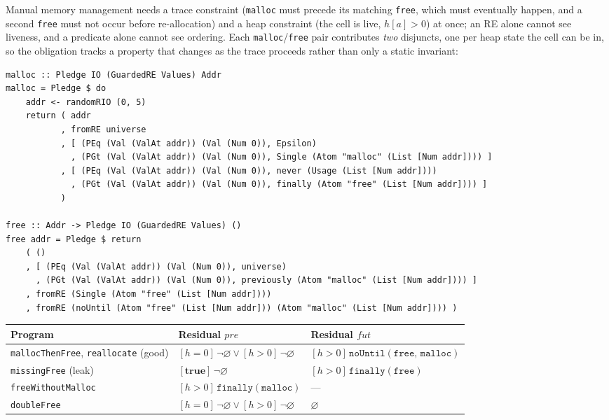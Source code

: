 \documentclass[acmsmall,screen]{acmart}
\newcommand{\pre}{\mathit{pre}}
\newcommand{\fut}{\mathit{fut}}
\newcommand{\finally}[1]{\mathtt{finally}(#1)}
\newcommand{\noUntil}[2]{\mathtt{noUntil}(#1,\,#2)}
\newcommand{\univ}{\neg\varnothing}
\begin{document}
Manual memory management needs a trace constraint (\lstinline{malloc} must
precede its matching \lstinline{free}, which must eventually happen, and a
second \lstinline{free} must not occur before re-allocation) and a heap
constraint (the cell is live, $h[a] > 0$) at once; an RE alone cannot see
liveness, and a predicate alone cannot see ordering.
Each \lstinline{malloc}/\lstinline{free} pair contributes \emph{two}
disjuncts, one per heap state the cell can be in, so the obligation tracks
a property that changes as the trace proceeds rather than only a static
invariant:
\begin{lstlisting}
malloc :: Pledge IO (GuardedRE Values) Addr
malloc = Pledge $ do
    addr <- randomRIO (0, 5)
    return ( addr
           , fromRE universe
           , [ (PEq (Val (ValAt addr)) (Val (Num 0)), Epsilon)
             , (PGt (Val (ValAt addr)) (Val (Num 0)), Single (Atom "malloc" (List [Num addr]))) ]
           , [ (PEq (Val (ValAt addr)) (Val (Num 0)), never (Usage (List [Num addr])))
             , (PGt (Val (ValAt addr)) (Val (Num 0)), finally (Atom "free" (List [Num addr]))) ]
           )

free :: Addr -> Pledge IO (GuardedRE Values) ()
free addr = Pledge $ return
    ( ()
    , [ (PEq (Val (ValAt addr)) (Val (Num 0)), universe)
      , (PGt (Val (ValAt addr)) (Val (Num 0)), previously (Atom "malloc" (List [Num addr]))) ]
    , fromRE (Single (Atom "free" (List [Num addr])))
    , fromRE (noUntil (Atom "free" (List [Num addr])) (Atom "malloc" (List [Num addr]))) )
\end{lstlisting}

\begin{center}
\small
\begin{tabular}{lll}
\toprule
Program & Residual $\pre$ & Residual $\fut$ \\
\midrule
\lstinline{mallocThenFree}, \lstinline{reallocate} (good)
  & $[h{=}0]\,\univ \lor [h{>}0]\,\univ$
  & $[h{>}0]\,\noUntil{\mathtt{free}}{\mathtt{malloc}}$ \\
\lstinline{missingFree} (leak)
  & $[\mathbf{true}]\,\univ$
  & $[h{>}0]\,\finally{\mathtt{free}}$ \\
\lstinline{freeWithoutMalloc}
  & $[h{>}0]\,\finally{\mathtt{malloc}}$
  & --- \\
\lstinline{doubleFree}
  & $[h{=}0]\,\univ \lor [h{>}0]\,\univ$
  & $\varnothing$ \\
\bottomrule
\end{tabular}
\end{center}
\end{document}

